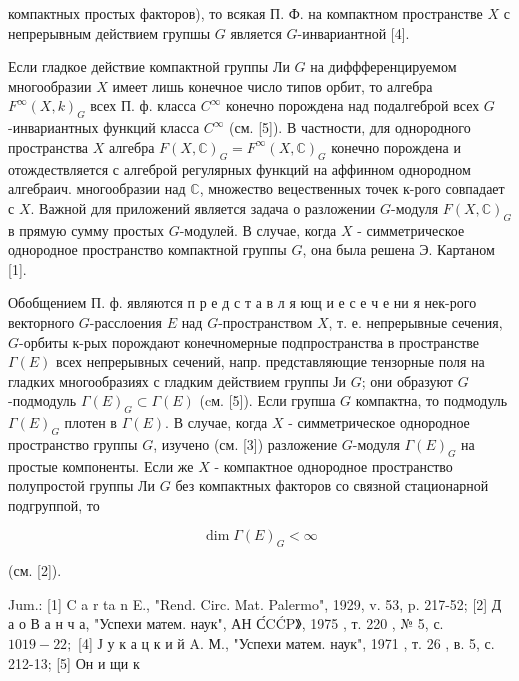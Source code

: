 \documentclass[10pt]{article}
\begin{document}
компактных простых факторов), то всякая П. Ф. на компактном пространстве $X$ с непрерывным действием групшы $G$ является $G$-инвариантной [4].



Если гладкое действие компактной группы Ли $G$ на диффференцируемом многообразии $X$ имеет лишь конечное число типов орбит, то алгебра $F^{\infty}(X, k)_{G}$ всех П. ф. класса $C^{\infty}$ конечно порождена над подалгеброй всех $G$-инвариантных функций класса $C^{\infty}$ (см. [5]). В частности, для однородного пространства $X$ алгебра $F(X, \mathbb{C})_{G}=F^{\infty}(X, \mathbb{C})_{G}$ конечно порождена и отождествляется с алгеброй регулярных функций на аффинном однородном алгебраич. многообразии над $\mathbb{C}$, множество вецественных точек к-рого совпадает с $X$. Важной для приложений является задача о разложении $G$-модуля $F(X, \mathbb{C})_{G}$ в прямую сумму простых $G$-модулей. В случае, когда $X$ - симметрическое однородное пространство компактной группы $G$, она была решена Э. Картаном [1].



Обобщением П. ф. являются п р е д с т а в л я ющ и е с е ч е ни я нек-рого векторного $G$-расслоения $E$ над $G$-пространством $X$, т. е. непрерывные сечения, $G$-орбиты к-рых порождают конечномерные подпространства в пространстве $\Gamma(E)$ всех непрерывных сечений, напр. представляющие тензорные поля на гладких многообразиях с гладким действием группы Ји $G$; они образуют $G$-подмодуль $\Gamma(E)_{G} \subset \Gamma(E)$ (cм. [5]). Если групша $G$ компактна, то подмодуль $\Gamma(E)_{G}$ плотен в $\Gamma(E)$. В случае, когда $X$ - симметрическое однородное пространство группы $G$, изучено (см. [3]) разложение $G$-модуля $\Gamma(E)_{G}$ на простые компоненты. Если же $X$ - компактное однородное пространство полупростой группы Ли $G$ без компактных факторов со связной стационарной подгруппой, то



\[

\operatorname{dim} \Gamma(E)_{G}<\infty

\]



(см. [2]).



Jum.: [1] C a r ta n E., "Rend. Circ. Mat. Palermo", 1929, v. 53, p. 217-52; [2] Д а о В а н ч а, "Успехи матем. наук", АН С́CĆP》, 1975 , т. 220 , № 5, с. $1019-22 ;$ [4] Ј у к а ц к и й A. М., "Успехи матем. наук", 1971 , т. 26 , в. 5, с. 212-13; [5] Он и щи к
\end{document}
